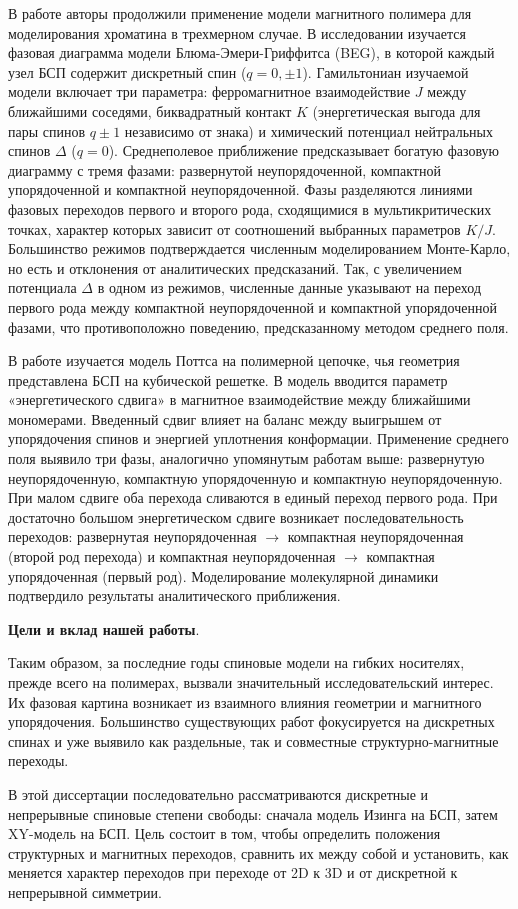  В работе \cite{D5SM00212E} авторы продолжили применение модели магнитного полимера для моделирования хроматина в трехмерном случае. 
 В исследовании изучается  фазовая диаграмма модели Блюма-Эмери-Гриффитса (BEG), в которой каждый узел БСП содержит дискретный спин ($q=0, \pm1$). 
 Гамильтониан изучаемой модели включает три параметра: ферромагнитное взаимодействие $J$ между ближайшими соседями,  биквадратный контакт $K$ (энергетическая выгода для пары спинов $ q \pm 1$ независимо от знака)  и химический потенциал нейтральных спинов $\Delta$ ($q=0$).
 Среднеполевое приближение предсказывает богатую фазовую диаграмму с тремя фазами: развернутой неупорядоченной, компактной упорядоченной и компактной неупорядоченной. 
 Фазы разделяются линиями фазовых переходов первого и второго рода, сходящимися в мультикритических точках, характер которых зависит от соотношений выбранных параметров $K/J$.  
 Большинство режимов подтверждается численным моделированием Монте-Карло, но есть и отклонения от аналитических предсказаний. 
 Так, с увеличением потенциала $\Delta$ в одном из режимов, численные данные указывают на переход первого рода между компактной неупорядоченной и компактной упорядоченной фазами, что противоположно поведению, предсказанному методом среднего поля.
 
В работе \cite{PhysRevE.109.014405} изучается модель Поттса на полимерной цепочке, чья геометрия представлена БСП на кубической решетке. 
В модель вводится параметр «энергетического сдвига» в магнитное взаимодействие между ближайшими мономерами. 
Введенный сдвиг влияет на баланс между выигрышем от упорядочения спинов и энергией уплотнения конформации. 
Применение среднего поля выявило три фазы, аналогично упомянутым работам выше: развернутую неупорядоченную, компактную упорядоченную и компактную неупорядоченную.
При малом сдвиге оба перехода сливаются в единый переход первого рода.
При достаточно большом энергетическом сдвиге возникает последовательность переходов: развернутая неупорядоченная $\rightarrow$ компактная неупорядоченная (второй род перехода) и компактная неупорядоченная $\rightarrow$  компактная  упорядоченная (первый род). Моделирование молекулярной динамики подтвердило результаты аналитического приближения. 
  

 
 \textbf{Цели и вклад нашей работы}.
 
 
 Таким образом, за последние годы спиновые модели на гибких носителях, прежде всего на полимерах, вызвали значительный исследовательский интерес. 
 Их фазовая картина возникает из взаимного влияния геометрии и магнитного упорядочения. 
 Большинство существующих работ фокусируется на дискретных спинах и уже выявило как раздельные, так и совместные структурно-магнитные переходы.
 
В этой диссертации последовательно рассматриваются дискретные и непрерывные спиновые степени свободы: сначала модель Изинга на БСП, затем XY-модель на БСП. 
Цель состоит в том, чтобы определить положения структурных и магнитных переходов, сравнить их между собой и установить, как меняется характер переходов при переходе от 2D к 3D и от дискретной к непрерывной симметрии.
